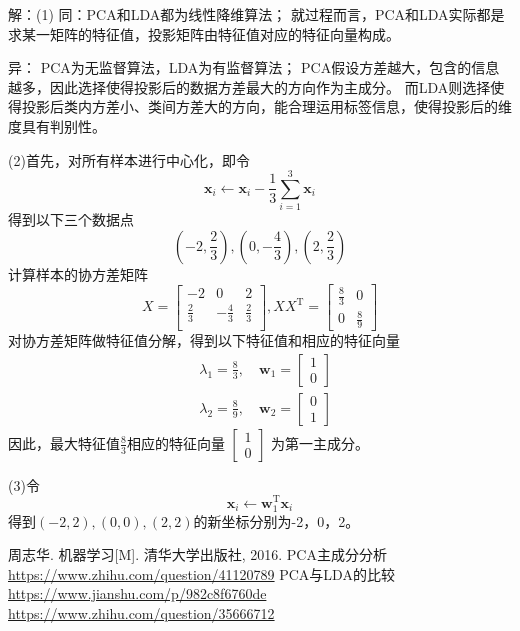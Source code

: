 \documentclass[a4paper,utf8]{article}
\begin{document}
	\noindent
	解：(1)
	同：PCA和LDA都为线性降维算法；
	就过程而言，PCA和LDA实际都是求某一矩阵的特征值，投影矩阵由特征值对应的特征向量构成。

	\noindent
	异：
	PCA为无监督算法，LDA为有监督算法；
	PCA假设方差越大，包含的信息越多，因此选择使得投影后的数据方差最大的方向作为主成分。
	而LDA则选择使得投影后类内方差小、类间方差大的方向，能合理运用标签信息，使得投影后的维度具有判别性。

	\noindent
	(2)首先，对所有样本进行中心化，即令
	\begin{equation}
		\bm{x}_i\leftarrow \bm{x}_i-\frac{1}{3}\sum_{i=1}^3 \bm{x}_i
	\end{equation}
	得到以下三个数据点
	\begin{equation*}
		(-2,\frac{2}{3}),(0,-\frac{4}{3}),(2,\frac{2}{3})
	\end{equation*}
	计算样本的协方差矩阵
	\begin{equation*}
		X=\left[
		\begin{matrix}
			-2 & 0 & 2 \\
			\frac{2}{3} & -\frac{4}{3} & \frac{2}{3} \\
		\end{matrix}
		\right],
		XX^\mathrm{T}
		=\left[
		\begin{matrix}
		\frac{8}{3} & 0 \\
		0 & \frac{8}{9}
		\end{matrix}
		\right]
	\end{equation*}
	对协方差矩阵做特征值分解，得到以下特征值和相应的特征向量
	\begin{align*}
		& \lambda_1=\frac{8}{3},\quad 
		\bm{w}_1=
		\left[
			\begin{matrix}
			1 \\
			0
			\end{matrix}
		\right]\\
		& \lambda_2=\frac{8}{9},\quad
		\bm{w}_2=
		\left[
			\begin{matrix}
			0 \\
			1
			\end{matrix}
		\right]
	\end{align*}
	因此，最大特征值$\frac{8}{3}$相应的特征向量
	$\left[
		\begin{matrix}
		1 \\
		0
		\end{matrix}
	\right]$
	为第一主成分。

	\noindent
	(3)令
	\begin{equation}
		\bm{x}_i\leftarrow \bm{w}_1^\mathrm{T}\bm{x}_i
	\end{equation}
	得到$(-2,2),(0,0),(2,2)$的新坐标分别为-2，0，2。
	

	\newpage
	\begin{thebibliography}{1}
		 周志华. 机器学习[M]. 清华大学出版社, 2016.
		 PCA主成分分析\\
					   \url{https://www.zhihu.com/question/41120789}
		 PCA与LDA的比较\\
					   \url{https://www.jianshu.com/p/982c8f6760de}\\
					   \url{https://www.zhihu.com/question/35666712}
	\end{thebibliography}
\end{document}
